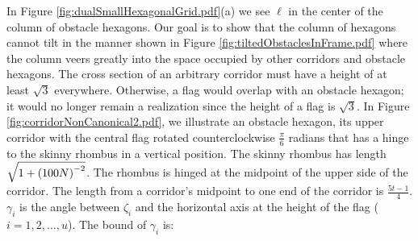 In Figure \ref{fig:dualSmallHexagonalGrid.pdf}(a) we see $\ell$ in the center of the column of obstacle hexagons.  
Our goal is to show that the column of hexagons cannot tilt in the manner shown in Figure \ref{fig:tiltedObstaclesInFrame.pdf} where the column veers greatly into the space occupied by other corridors and obstacle hexagons.
The cross section of an arbitrary corridor must have a height of at least $\sqrt{3}$ everywhere. 
Otherwise, a flag would overlap with an obstacle hexagon; it would no longer remain a realization since the height of a flag is $\sqrt{3}$.
In Figure \ref{fig:corridorNonCanonical2.pdf}, we illustrate an obstacle hexagon, its upper corridor with the central flag rotated counterclockwise $\frac{\pi}{6}$ radians that has a hinge to the skinny rhombus in a vertical position.  
The skinny rhombus has length $\sqrt{1 + \left( 100N \right)^{-2}}$.
The rhombus is hinged at the midpoint of the upper side of the corridor.
The length from a corridor's midpoint to one end of the corridor is $\frac{5t-1}{4}$.
$\gamma_i$ is the angle between $\zeta_i$ and the horizontal axis at the height of the flag ($i = 1,2,\ldots, u$).
The bound of $\gamma_i$ is:
